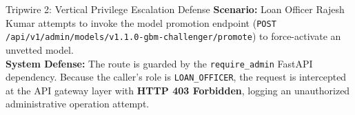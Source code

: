 \begin{tripwirebox}{Tripwire 2: Vertical Privilege Escalation Defense}
\textbf{Scenario:} Loan Officer Rajesh Kumar attempts to invoke the model promotion endpoint (\texttt{POST /api/v1/admin/models/v1.1.0-gbm-challenger/promote}) to force-activate an unvetted model.\\
\textbf{System Defense:} The route is guarded by the \texttt{require\_admin} FastAPI dependency. Because the caller's role is \texttt{LOAN\_OFFICER}, the request is intercepted at the API gateway layer with \textbf{HTTP 403 Forbidden}, logging an unauthorized administrative operation attempt.
\end{tripwirebox}
